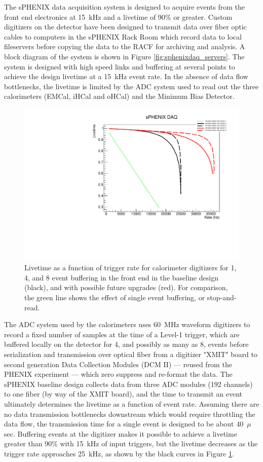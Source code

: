 The sPHENIX data acquisition system is designed to acquire events from
the front end electronics at 15~kHz and a livetime of 90\% or greater.
Custom digitizers on the detector have been designed to transmit data
over fiber optic cables to computers in the sPHENIX Rack Room which
record data to local fileservers before copying the data to the RACF
for archiving and analysis.  A block diagram of the system is shown in
Figure \ref{fig:sphenixdaq_servers}.  The system is designed with high
speed links and buffering at several points to achieve the design
livetime at a 15~kHz event rate.  In the absence of data flow
bottlenecks, the livetime is limited by the ADC system used to read
out the three calorimeters (EMCal, iHCal and oHCal) and the Minimum
Bias Detector.

\begin{figure}
    \centering
    \includegraphics[trim = 0 0 0 25, clip,
    width=0.75\linewidth]{figs/sphenix_daqrate_3.pdf} 
    \caption{Livetime as a function of trigger rate for calorimeter digitizers for
    1, 4, and 8 event buffering in the front end in the baseline design (black),
    and with possible future upgrades (red).  For comparison, the
    green line shows the effect of single event buffering, or
    stop-and-read.} 
    \label{fig:sphenix_daqrate}
\end{figure}

The ADC system used by the calorimeters uses 60~MHz waveform
digitizers to record a fixed number of samples at the time of a
Level-1 trigger, which are buffered locally on the detector for 4, and
possibly as many as 8, events before serialization and transmission
over optical fiber from a digitizer "XMIT" board to second generation
Data Collection Modules (DCM II) --- reused from the PHENIX experiment
--- which zero suppress and re-format the data.  The sPHENIX baseline
design collects data from three ADC modules (192 channels) to one
fiber (by way of the XMIT board), and the time to transmit an event
ultimately determines the livetime as a function of event rate.
Assuming there are no data transmission bottlenecks downstream which
would require throttling the data flow, the transmission time for a
single event is designed to be about 40~$\mu$sec.  Buffering events at
the digitizer makes it possible to achieve a livetime greater than
90\% with 15~kHz of input triggers, but the livetime decreases as the
trigger rate approaches 25~kHz, as shown by the black curves in Figure
\ref{fig:sphenix_daqrate}.

